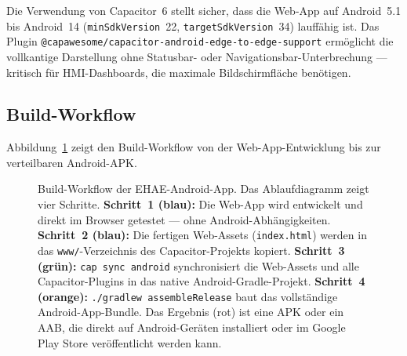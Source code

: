 ﻿\documentclass[12pt,a4paper]{article}
\begin{document}
Die Verwendung von Capacitor~6 stellt sicher, dass die Web-App auf Android~5.1 bis
Android~14 (\texttt{minSdkVersion}~22, \texttt{targetSdkVersion}~34) lauffähig ist.
Das Plugin \texttt{@capawesome/\newline capacitor-android-edge-to-edge-support} ermöglicht die
vollkantige Darstellung ohne Statusbar- oder Navigationsbar-Unterbrechung --- kritisch
für HMI-Dashboards, die maximale Bildschirmfläche benötigen.

\subsection{Build-Workflow}

Abbildung~\ref{fig:capacitor_build} zeigt den Build-Workflow von der Web-App-Entwicklung
bis zur verteilbaren Android-APK.

\begin{figure}[h]
\centering
{}
\caption{Build-Workflow der EHAE-Android-App. Das Ablaufdiagramm zeigt vier Schritte.
  \textbf{Schritt~1 (blau):} Die Web-App wird entwickelt und direkt im Browser
  getestet --- ohne Android-Abhängigkeiten. \textbf{Schritt~2 (blau):} Die fertigen
  Web-Assets (\texttt{index.html}) werden in das \texttt{www/}-Verzeichnis des
  Capacitor-Projekts kopiert. \textbf{Schritt~3 (grün):} \texttt{cap sync android}
  synchronisiert die Web-Assets und alle Capacitor-Plugins in das native
  Android-Gradle-Projekt. \textbf{Schritt~4 (orange):} \texttt{./gradlew
  assembleRelease} baut das vollständige Android-App-Bundle. Das Ergebnis (rot) ist
  eine APK oder ein AAB, die direkt auf Android-Geräten installiert oder im
  Google Play Store veröffentlicht werden kann.}
\label{fig:capacitor_build}
\end{figure}
\end{document}
